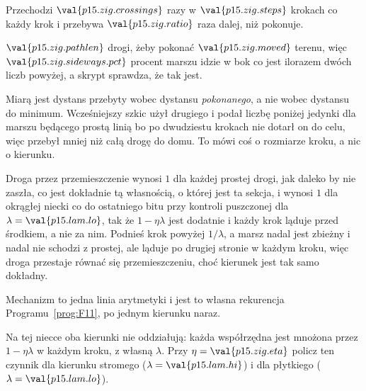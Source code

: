 \begin{fr}
\begin{ansblock}
Przechodzi $\val{p15.zig.crossings}$ razy w $\val{p15.zig.steps}$ krokach
\dash{} co każdy krok \dash{} i przebywa $\val{p15.zig.ratio}$ raza dalej,
niż pokonuje.
\end{ansblock}

$\val{p15.zig.pathlen}$ drogi, żeby pokonać $\val{p15.zig.moved}$ terenu, więc
$\val{p15.zig.sideways.pct}$ procent marszu idzie w bok \dash{} co jest
ilorazem dwóch liczb powyżej, a skrypt sprawdza, że tak jest.

\begin{note}
Miarą jest dystans przebyty wobec dystansu \emph{pokonanego}, a nie wobec
dystansu do minimum. Wcześniejszy szkic użył drugiego i podał liczbę poniżej
jedynki dla marszu będącego prostą linią \dash{} bo po dwudziestu krokach nie
dotarł on do celu, więc przebył mniej niż całą drogę do domu. To mówi coś o
rozmiarze kroku, a nic o kierunku.

Droga przez przemieszczenie wynosi $1$ dla każdej prostej drogi, jak daleko by
nie zaszła, co jest dokładnie tą własnością, o której jest ta sekcja, i wynosi
$1$ dla okrągłej niecki co do ostatniego bitu \dash{} przy kontroli puszczonej
dla $\lambda = \val{p15.lam.lo}$, tak że $1 - \eta\lambda$ jest dodatnie i
każdy krok ląduje przed środkiem, a nie za nim. Podnieś krok powyżej
$1/\lambda$, a marsz nadal jest zbieżny i nadal nie schodzi z prostej, ale
ląduje po drugiej stronie w każdym kroku, więc droga przestaje równać się
przemieszczeniu, choć kierunek jest tak samo dokładny.
\end{note}
\end{fr}

\begin{fr}
Mechanizm to jedna linia arytmetyki i jest to własna rekurencja
Programu~\ref{prog:F11}, po jednym kierunku naraz.

Na tej niecce oba kierunki nie oddziałują: każda współrzędna jest mnożona
przez $1 - \eta\lambda$ w każdym kroku, z własną $\lambda$. Przy
$\eta = \val{p15.zig.eta}$ policz ten czynnik dla kierunku stromego
($\lambda = \val{p15.lam.hi}$) i dla płytkiego
($\lambda = \val{p15.lam.lo}$).
\dotline
\nextframe
\end{fr}

